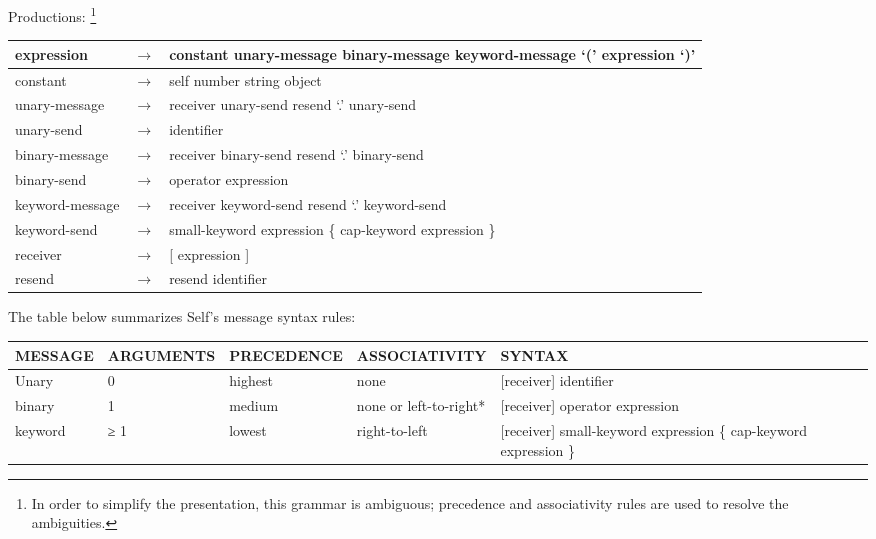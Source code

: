 \documentclass[letterpaper,10pt,english]{sphinxmanual}
\begin{document}
Productions: \footnote{
In order to simplify the presentation, this grammar is ambiguous; precedence and associativity rules are used to resolve the ambiguities.
}

\begin{tabulary}{\linewidth}{|L|L|L|}
\hline

expression
 & 
\(\rightarrow\)
 & 
constant \textbar{} unary-message \textbar{} binary-message \textbar{} keyword-message \textbar{} ‘(’ expression ‘)’
\\\hline

constant
 & 
\(\rightarrow\)
 & 
self \textbar{} number \textbar{} string \textbar{} object
\\\hline

unary-message
 & 
\(\rightarrow\)
 & 
receiver unary-send \textbar{} resend ‘.’ unary-send
\\\hline

unary-send
 & 
\(\rightarrow\)
 & 
identifier
\\\hline

binary-message
 & 
\(\rightarrow\)
 & 
receiver binary-send \textbar{} resend ‘.’ binary-send
\\\hline

binary-send
 & 
\(\rightarrow\)
 & 
operator expression
\\\hline

keyword-message
 & 
\(\rightarrow\)
 & 
receiver keyword-send \textbar{} resend ‘.’ keyword-send
\\\hline

keyword-send
 & 
\(\rightarrow\)
 & 
small-keyword expression \{ cap-keyword expression \}
\\\hline

receiver
 & 
\(\rightarrow\)
 & 
{[} expression {]}
\\\hline

resend
 & 
\(\rightarrow\)
 & 
resend \textbar{} identifier
\\\hline
\end{tabulary}


The table below summarizes Self’s message syntax rules:

\begin{tabulary}{\linewidth}{|L|L|L|L|L|}
\hline

MESSAGE
 & 
ARGUMENTS
 & 
PRECEDENCE
 & 
ASSOCIATIVITY
 & 
SYNTAX
\\\hline

Unary
 & 
0
 & 
highest
 & 
none
 & 
{[}receiver{]} identifier
\\\hline

binary
 & 
1
 & 
medium
 & 
none or left-to-right*
 & 
{[}receiver{]} operator expression
\\\hline

keyword
 & 
≥ 1
 & 
lowest
 & 
right-to-left
 & 
{[}receiver{]} small-keyword expression \{ cap-keyword expression \}
\\\hline
\end{tabulary}
\end{document}
